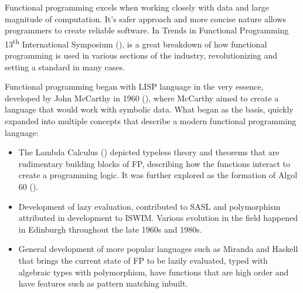 Functional programming excels when working closely with data and large magnitude of computation. It's safer approach and more concise nature allows programmers to create reliable software. In Trends in Functional Programming 13\textsuperscript{th} International Symposium (\textcite{turner2004total}), is a great breakdown of how functional programming is used in various sections of the industry, revolutionizing and setting a standard in many cases.

Functional programming began with LISP language in the very essence, developed by John McCarthy in 1960 (\textcite{mccarthy1960lisp}), where McCarthy aimed to create a language that would work with symbolic data. What began as the basis, quickly expanded into multiple concepts that describe a modern functional programming language:

\begin{itemize}
  \item The Lambda Calculus (\textcite{Rosser1941-ROSCAT-17}) depicted typeless theory and theorems that are rudimentary building blocks of FP, describing how the functions interact to create a programming logic. It was further explored as the formation of Algol 60 (\textcite{backus1963revised}).
  \item Development of lazy evaluation, contributed to SASL and polymorphism attributed in development to ISWIM. Various evolution in the field happened in Edinburgh throughout the late 1960s and 1980s.
  \item General development of more popular languages such as Miranda and Haskell that brings the current state of FP to be lazily evaluated, typed with algebraic types with polymorphism, have functions that are high order and have features such as pattern matching inbuilt. 
\end{itemize}

%

